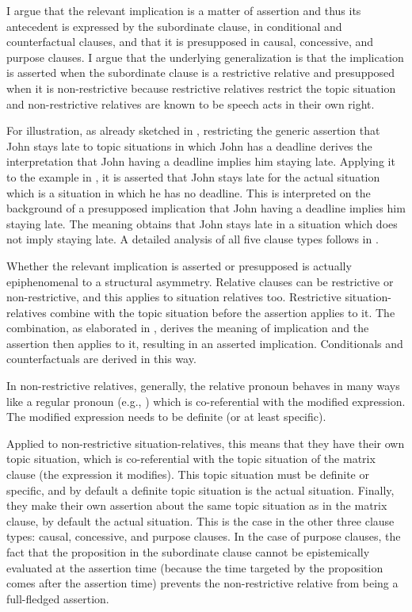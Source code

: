 \documentclass[output=paper]{langscibook}
\begin{document}
I argue that the relevant implication is a matter of assertion and thus its antecedent is expressed by the subordinate clause, in conditional and counterfactual clauses, and that it is presupposed in causal, concessive, and purpose clauses. I argue that the underlying generalization is that the implication is asserted when the subordinate clause is a restrictive relative and presupposed when it is non-restrictive because restrictive relatives restrict the topic situation and non-restrictive relatives are known to be speech acts in their own right.

For illustration, as already sketched in , restricting the generic assertion that John stays late to topic situations in which John has a deadline derives the interpretation that John having a deadline implies him staying late. Applying it to the example in , it is asserted that John stays late for the actual situation which is a situation in which he has no deadline. This is interpreted on the background of a presupposed implication that John having a deadline implies him staying late. The meaning obtains that John stays late in a situation which does not imply staying late. A detailed analysis of all five clause types follows in .\largerpage[1.75]

Whether the relevant implication is asserted or presupposed is actually epi\-phenomenal to a structural asymmetry. Relative clauses can be restrictive or non-restrictive, and this applies to situation relatives too. Restrictive situation-relatives combine with the topic situation before the assertion applies to it. The combination, as elaborated in , derives the meaning of implication and the assertion then applies to it, resulting in an asserted implication. Conditionals and counterfactuals are derived in this way.

In non-restrictive relatives, generally, the relative pronoun behaves in many ways like a regular pronoun (e.g., \citealt{Vries2002}) which is co-referential with the modified expression. The modified expression needs to be definite (or at least specific).

Applied to non-restrictive situation-relatives, this means that they have their own topic situation, which is co-referential with the topic situation of the matrix clause (the expression it modifies). This topic situation must be definite or specific, and by default a definite topic situation is the actual situation. Finally, they make their own assertion about the same topic situation as in the matrix clause, by default the actual situation. This is the case in the other three clause types: causal, concessive, and purpose clauses. In the case of purpose clauses, the fact that the proposition in the subordinate clause cannot be epistemically evaluated at the assertion time (because the time targeted by the proposition comes after the assertion time) prevents the non-restrictive relative from being a full-fledged assertion.
\end{document}
